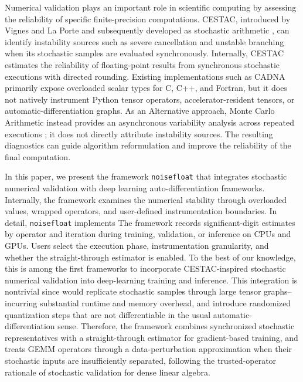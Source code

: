 \documentclass[manuscript, screen]{acmart}
\newcommand{\xyy}[1]{{\color{black}{#1}}}
\begin{document}
Numerical validation plays an important role in scientific computing by assessing the reliability of specific finite-precision computations. CESTAC, introduced by Vignes and La Porte \citep{vignes1974error} and subsequently developed as stochastic arithmetic \citep{VIGNES1993233}, can identify instability sources such as severe cancellation and unstable branching when its stochastic samples are evaluated synchronously. Internally, CESTAC estimates the reliability of floating-point results from synchronous stochastic executions with directed rounding.  Existing implementations such as CADNA primarily expose overloaded scalar types for C, C++, and Fortran, but it does not natively instrument Python tensor operators, accelerator-resident tensors, or automatic-differentiation graphs. As an Alternative approach, Monte Carlo Arithmetic instead provides an asynchronous variability analysis across repeated executions \citep{parker1997mca}; it does not directly attribute instability sources. The resulting diagnostics can guide algorithm reformulation and improve the reliability of the final computation.



In this paper, we present the framework \texttt{noisefloat} that integrates stochastic numerical validation with deep learning auto-differentiation frameworks. Internally, the framework examines the numerical stability through overloaded values, wrapped operators, and user-defined instrumentation boundaries. In detail, \texttt{noisefloat} implements \xyy{arithmetic-level instrumentation with CESTAC-style stochastic propagation on supported exposed operations.} The framework records significant-digit estimates by operator and iteration during training, validation, or inference on CPUs and GPUs. Users select the execution phase, instrumentation granularity, and whether the straight-through estimator is enabled. To the best of our knowledge, this is among the first frameworks to incorporate CESTAC-inspired stochastic numerical validation into deep-learning training and inference.
This integration is nontrivial since \xyy{directly applying instruction-level CESTAC throughout deep-learning operators} would replicate stochastic samples through large tensor graphs{--}incurring substantial runtime and memory overhead, and introduce randomized quantization steps that are not differentiable in the usual automatic-differentiation sense. Therefore, the framework combines synchronized stochastic representatives with a straight-through estimator for gradient-based training, and treats GEMM operators through a data-perturbation approximation when their stochastic inputs are insufficiently separated, following the trusted-operator rationale of stochastic validation for dense linear algebra.
\end{document}

